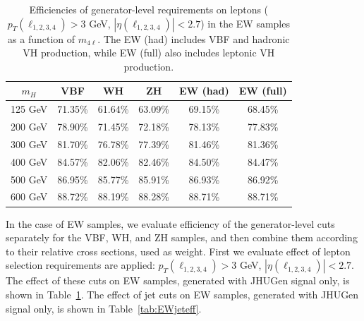 \begin{table}[!hbt]
\begin{center}
\small
\begin{tabular}{|c|c|c|c|c|c|}
\hline
$m_H$ & VBF & WH  & ZH  & EW (had) & EW (full) \\ 
\hline
125 GeV  & 71.35\%    & 61.64\%    & 63.09\%    & 69.15\%     & 68.45\%              \\ 
200 GeV  & 78.90\%    & 71.45\%    & 72.18\%    & 78.13\%     & 77.83\%              \\ 
300 GeV  & 81.70\%    & 76.78\%    & 77.39\%    & 81.46\%     & 81.36\%              \\ 
400 GeV  & 84.57\%    & 82.06\%    & 82.46\%    & 84.50\%     & 84.47\%              \\  
500 GeV  & 86.95\%    & 85.77\%    & 85.91\%    & 86.93\%     & 86.92\%               \\  
600 GeV  & 88.72\%    & 88.19\%    & 88.28\%    & 88.71\%     & 88.71\%               \\  
\hline
\end{tabular}
\caption{
Efficiencies of generator-level requirements on leptons ($p_T(\ell_{1,2,3,4})> 3$ GeV, $|\eta(\ell_{1,2,3,4})| < 2.7$)
in the \offshell EW samples as a function of $m_{4\ell}$.
The EW (had) includes VBF and hadronic VH production, 
while EW (full) also includes leptonic VH production. 
}
\label{tab:EWlepteff}
\end{center}
\end{table}

In the case of EW \offshell samples, we evaluate efficiency of the generator-level cuts separately for
the VBF, WH, and ZH samples, and then combine them according to their relative cross sections, used as weight. 
First we evaluate effect of lepton selection requirements are applied:
\noindent $p_T(\ell_{1,2,3,4})> 3$ GeV, $|\eta(\ell_{1,2,3,4})| < 2.7$.
The effect of these cuts on EW samples, generated with JHUGen signal only, 
is shown in Table~\ref{tab:EWlepteff}.
The effect of jet cuts on EW samples, generated with JHUGen signal only, 
is shown in Table~\ref{tab:EWjeteff}.

